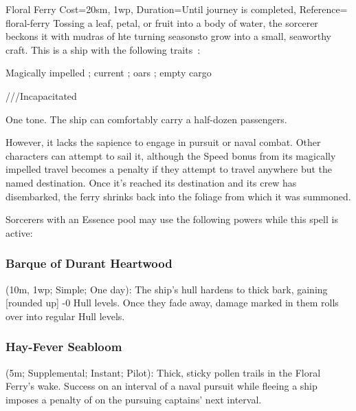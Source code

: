 \begin{Spell}{Floral Ferry}{%
    Cost={20sm, 1wp},
    Duration=Until journey is completed,
    Reference=\cite*[p.~310]{db}
}{floral-ferry}
    Tossing a leaf, petal, or fruit into a body of water, the sorcerer beckons
    it with mudras of hte turning seasonsto grow into a small, seaworthy craft.
    This is a ship with the following traits~\parencite*[p.244]{ex3}:

    \begin{description}[noitemsep]
        \item[Speed:] Magically impelled ; current ;
            oars ; empty cargo 
        \item[Maneuverability:] 
        \item[Hull:] ///Incapacitated
        \item[Cargo:] One tone. The ship can comfortably carry a half-dozen
            passengers.
    \end{description}

     However, it lacks the sapience to engage in pursuit or
    naval combat. Other characters can attempt to sail it, although the Speed
    bonus from its magically impelled travel becomes a  penalty if
    they attempt to travel anywhere but the named destination. Once it's
    reached its destination and its crew has disembarked, the ferry shrinks
    back into the foliage from which it was summoned.

    Sorcerers with an Essence pool may use the following powers while this
    spell is active:

    \subsubsection{Barque of Durant Heartwood} (10m, 1wp; Simple; One day):
    The ship's hull hardens to thick bark, gaining
    [rounded up] \Modifier-{0} Hull levels. Once
    they fade away, damage marked in them rolls over into regular Hull levels.

    \subsubsection{Hay-Fever Seabloom} (5m; Supplemental; Instant; Pilot):
    Thick, sticky pollen trails in the Floral Ferry's wake. Success on an
    interval of a naval pursuit while fleeing a ship imposes a penalty of
     on the pursuing captains'
    next interval.


\end{Spell}
